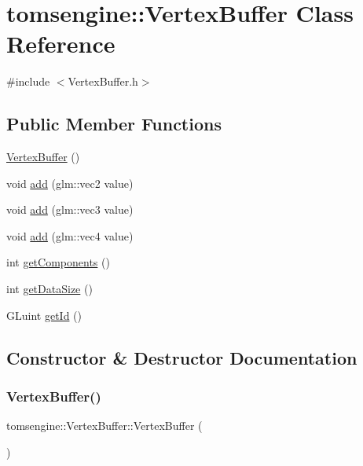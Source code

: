 \hypertarget{classtomsengine_1_1_vertex_buffer}{}\section{tomsengine\+:\+:Vertex\+Buffer Class Reference}
\label{classtomsengine_1_1_vertex_buffer}


{\ttfamily \#include $<$Vertex\+Buffer.\+h$>$}

\subsection*{Public Member Functions}
\begin{DoxyCompactItemize}
\item 
\mbox{\hyperlink{classtomsengine_1_1_vertex_buffer_abca71af12ff47c217e20339b7e01de55}{Vertex\+Buffer}} ()
\item 
void \mbox{\hyperlink{classtomsengine_1_1_vertex_buffer_abae8451195dd422b63984bbdc6be0057}{add}} (glm\+::vec2 value)
\item 
void \mbox{\hyperlink{classtomsengine_1_1_vertex_buffer_ab2625dd07630e3c688b2eb0850f8e056}{add}} (glm\+::vec3 value)
\item 
void \mbox{\hyperlink{classtomsengine_1_1_vertex_buffer_ae82b34dbc0446ba909d8f77623151c77}{add}} (glm\+::vec4 value)
\item 
int \mbox{\hyperlink{classtomsengine_1_1_vertex_buffer_a8c14b28f3a7e8be817fe96fee3eff267}{get\+Components}} ()
\item 
int \mbox{\hyperlink{classtomsengine_1_1_vertex_buffer_ae8896eeaab9d4602d4d4f7db3d583d87}{get\+Data\+Size}} ()
\item 
G\+Luint \mbox{\hyperlink{classtomsengine_1_1_vertex_buffer_a2a50925ab34c9084ccb164188fcf35b2}{get\+Id}} ()
\end{DoxyCompactItemize}


\subsection{Constructor \& Destructor Documentation}
\mbox{\label{classtomsengine_1_1_vertex_buffer_abca71af12ff47c217e20339b7e01de55}} 
\subsubsection{\texorpdfstring{Vertex\+Buffer()}{VertexBuffer()}}
{\footnotesize\ttfamily tomsengine\+::\+Vertex\+Buffer\+::\+Vertex\+Buffer (\begin{DoxyParamCaption}{ }\end{DoxyParamCaption})}



